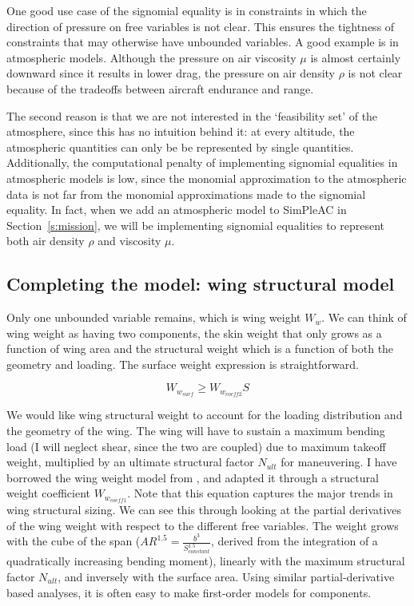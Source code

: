One good use case of the signomial equality is in constraints in which the direction
of pressure on free variables is not clear. This ensures the tightness of constraints
that may otherwise have unbounded variables. A good example is in atmospheric models.
Although the pressure on air viscosity $\mu$ is almost certainly downward since it results in
lower drag, the pressure on air density $\rho$ is not clear because of the tradeoffs between
aircraft endurance and range.

The second reason is that we are not interested in the `feasibility set' of the atmosphere,
since this has no intuition behind it: at every altitude, the atmospheric quantities
can only be be represented by single quantities. Additionally, the computational penalty of
implementing signomial equalities in atmospheric models is low, since the monomial approximation
to the atmospheric data is not far from the monomial approximations made to the signomial equality.
In fact, when we add an atmospheric model to SimPleAC in
Section~\ref{s:mission}, we will be implementing signomial equalities to represent both air density
$\rho$ and viscosity $\mu$.

\subsection{Completing the model: wing structural model}
\label{s:wingstrc}

Only one unbounded variable remains, which is wing weight $W_w$. We can think
of wing weight as having two components, the skin weight that
only grows as a function of wing area and the structural weight which is a function of
both the geometry and loading. The surface weight expression is straightforward.

\begin{equation} W_{w_{surf}} \geq W_{w_{coeff2}} S \label{e:wwsurf} \end{equation}

We would like wing structural weight to account for the loading distribution and the geometry
of the wing. The wing will have to sustain a maximum bending load (I will neglect shear, since
the two are coupled) due to maximum takeoff weight,
multiplied by an ultimate structural factor $N_{ult}$ for maneuvering.
I have borrowed the wing weight model from \cite{gp_ac_design}, and adapted it through a
structural weight coefficient $W_{w_{coeff1}}$. Note that this equation captures the
major trends in wing structural sizing. We can see this through looking at the partial
derivatives of the wing weight with respect to the different free variables.
The weight grows with the cube of the span ($AR^{1.5} = \frac{b^3}{S_{constant}^{1.5}}$, derived
from the integration of a quadratically increasing bending moment),
linearly with the maximum structural factor $N_{ult}$, and inversely with the
surface area\footnotemark. Using similar partial-derivative based analyses, it
is often easy to make first-order models for components.

